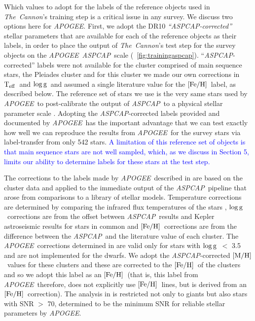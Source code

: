 \documentclass[12pt, preprint]{aastex}
\newcommand{\tc}{\textsl{The~Cannon}}
\newcommand{\apogee}{\textsl{APOGEE}}
\newcommand{\aspcap}{\textsl{ASPCAP}}
\newcommand{\teff}{\mbox{$\rm T_{eff}$}}
\newcommand{\feh}{\mbox{$\rm [Fe/H]$}}
\newcommand{\mh}{\mbox{$\rm [M/H]$}}
\newcommand{\logg}{\mbox{$\rm \log g$}}
\begin{document}
Which values to adopt for the labels of the reference objects used in \tc 's training step is a critical issue
in any survey. We discuss two options here for \apogee . 
First, we adopt the DR10 \textit{``\aspcap-corrected''} stellar parameters \citep{Meszaros2013} that are available for each of the reference objects as their labels, in order to place the output of \tc 's test step for the survey objects on the \apogee\ \aspcap\ scale (\figurename~\ref{fig:trainingaspcap}). ``\aspcap-corrected'' labels were not available for the cluster comprised of main sequence stars, the Pleiades cluster and for this cluster we made our own corrections in \teff\ and \logg\ and assumed a single literature value for the \feh\ label, as described below. 
The reference set of stars we use is the very same stars used by \apogee\ to post-calibrate the output of \aspcap\ to a physical stellar parameter scale \citep{Meszaros2013}.
Adopting the \aspcap-corrected labels provided and documented by \apogee\ has the important advantage 
that we can test exactly how well we can reproduce the results from \apogee\ for the survey stars via label-transfer from only 542 stars. \textcolor{blue}{A limitation of this reference set of objects is that main sequence stars are not well sampled, which, as we discuss in Section 5, limits our ability to determine labels for these stars at the test step. }

The corrections to the labels made by \apogee\ described in \citet{Meszaros2013} are based on the cluster data and applied to the immediate output of the \aspcap\ pipeline that arose from comparisons to a library of stellar models.
Temperature corrections are determined by comparing the infrared flux temperatures of the stars \citep{gonzalez2009}, \logg\ corrections are from the offset between \aspcap\ results and Kepler astroseismic results for stars in common and \feh\ corrections are from the difference between the \aspcap\ and  the literature value of each cluster.  
The \apogee\ corrections determined in \citet{Meszaros2013} are valid only for stars with \logg\ $<$ 3.5 and are not implemented for the dwarfs.  We adopt the \aspcap-corrected \mh\ values for these clusters and these are corrected to the \feh\ of the clusters and so we adopt this label as an \feh\ (that is, this label from \apogee\ therefore, does not explicitly use \feh\ lines, but is derived from an \feh\ correction). 
The analysis in \citet{Meszaros2013} is restricted not only to giants but also stars with SNR $>$ 70, determined to be the minimum SNR for reliable stellar parameters by \apogee.
\end{document}
